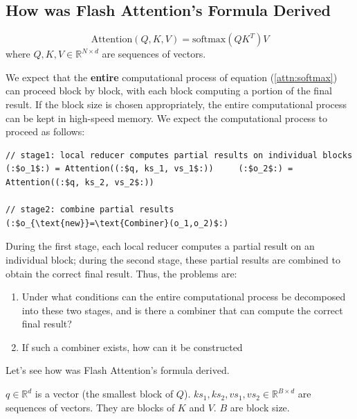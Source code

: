\newpage
\subsection{How was Flash Attention's Formula Derived}

\begin{equation}
\text{Attention}(Q, K, V)=\text{softmax}(QK^T)V \label{attn:softmax}
\end{equation}
where $Q, K, V\in \mathbb{R}^{N\times d}$ are sequences of vectors.

We expect that \textcolor{byzantium}{the \textbf{entire} computational process of equation (\ref{attn:softmax}) can proceed block by block, with each block computing a portion of the final result}.
If the block size is chosen appropriately, the entire computational process can be kept in high-speed memory.
We expect the computational process to proceed as follows:
\begin{lstlisting}[language=code_example2, caption={}]
// stage1: local reducer computes partial results on individual blocks
(:$o_1$:) = Attention((:$q, ks_1, vs_1$:))     (:$o_2$:) = Attention((:$q, ks_2, vs_2$:))

// stage2: combine partial results
(:$o_{\text{new}}=\text{Combiner}(o_1,o_2)$:)
\end{lstlisting}
\textcolor{byzantium}{During the first stage, each local reducer computes a partial result on an individual block; during the second stage, these partial results are combined to obtain the correct final result}.
Thus, the problems are:
\begin{enumerate}
\item Under what conditions can the entire computational process be decomposed into these two stages, and is there a combiner that can compute the correct final result?
\item If such a combiner exists, how can it be constructed
\end{enumerate}

Let's see how was Flash Attention's formula derived.

$q\in \mathbb{R}^d$ is a vector (the smallest block of $Q$). $ks_1, ks_2, vs_1, vs_2 \in \mathbb{R}^{B \times d}$ are sequences of vectors. They are blocks of $K$ and $V$. $B$ are block size.

